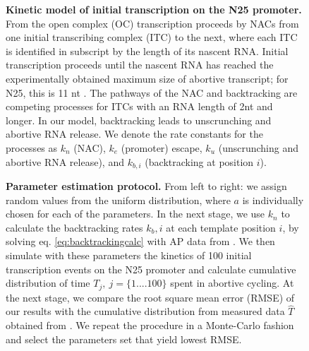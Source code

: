 \documentclass{bmcart}
\begin{document}
\begin{backmatter}
\begin{figure}[h!]
    \begin{center}
    \end{center}
  \caption{{\bf Kinetic model of initial transcription on the N25 promoter.}
    From the open complex (OC) transcription proceeds by NACs from one initial
    transcribing complex (ITC) to the next, where each ITC is identified in
    subscript by the length of its nascent RNA. Initial transcription proceeds
    until the nascent RNA has reached the experimentally obtained maximum size
    of abortive transcript; for N25, this is 11 nt \cite{hsu_initial_2006}.
    The pathways of the NAC and backtracking are competing processes for ITCs
    with an RNA length of 2nt and longer. In our model, backtracking leads to
    unscrunching and abortive RNA release. We denote the rate constants for
    the processes as $k_n$ (NAC), $k_e$ (promoter)
    escape, $k_u$ (unscrunching and abortive RNA release), and $k_{b,i}$ 
    (backtracking at position $i$).} \label{fig:model_and_rates}
\end{figure}

\begin{figure}[h!]
    \begin{center}
    \end{center}
  \caption{ {\bf Parameter estimation protocol.}
    From left to right: we assign random values from the uniform distribution,
    where $a$ is individually chosen for each of the parameters. In the next
    stage, we use $k_n$ to calculate the backtracking rates $k_b,i$ at each
    template position $i$, by solving eq. \ref{eq:backtrackingcalc} with AP
    data from \cite{hsu_initial_2006}. We then simulate with these parameters
    the kinetics of 100 initial transcription events on the N25 promoter 
    and calculate cumulative distribution of time $T_j,\ j=\{1....100\}$ spent
    in abortive cycling. At the next stage, we compare the root square mean
    error (RMSE) of our results with the cumulative distribution from measured
    data $\hat T$ obtained from \cite{revyakin_abortive_2006}.  We repeat the
    procedure in a Monte-Carlo fashion and select the parameters set that
  yield lowest RMSE.}
    \label{fig:param_estimation_scheme}
\end{figure}


\end{backmatter}
\end{document}
